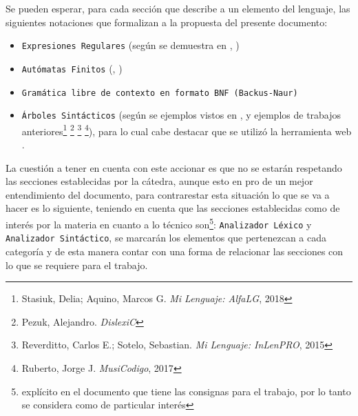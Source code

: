 Se pueden esperar, para cada sección que describe a un elemento del lenguaje,
las siguientes notaciones que formalizan a la propuesta del presente
documento:
\begin{itemize}
  \item \texttt{Expresiones Regulares} (según se demuestra en \cite{regexr},
    \cite{dib})
  \item \texttt{Autómatas Finitos} (\cite{aho2008}, \cite{catalan2010})
  \item \texttt{Gramática libre de contexto en formato BNF (Backus-Naur)}
  \item \texttt{Árboles Sintácticos} (según se ejemplos vistos en
    \cite{aho2008}, y ejemplos de trabajos anteriores\footnote{Stasiuk, Delia;
    Aquino, Marcos G. \textit{Mi Lenguaje: AlfaLG}, 2018} \footnote{Pezuk,
    Alejandro. \textit{DislexiC}} \footnote{Reverditto, Carlos E.; Sotelo, Sebastian.
    \textit{Mi Lenguaje: InLenPRO}, 2015} \footnote{Ruberto, Jorge J.
    \textit{MusiCodigo}, 2017}),
    para lo cual cabe destacar que se utilizó la herramienta
    web \cite[phpSyntaxTree]{syntree}.
\end{itemize}

La cuestión a tener en cuenta con este accionar es que no se estarán respetando las secciones
establecidas por la cátedra, aunque esto en pro de un mejor entendimiento del
documento, para contrarestar esta situación lo que se va a hacer es lo
siguiente, teniendo en cuenta que las secciones establecidas como de interés
por la materia en cuanto a lo técnico son\footnote{explícito en el
documento que tiene las consignas para el trabajo, por lo tanto se considera
como de particular interés}: \texttt{Analizador Léxico} y \texttt{Analizador
Sintáctico}, se marcarán los elementos que pertenezcan a cada categoría y de
esta manera contar con una forma de relacionar las secciones con lo que se
requiere para el trabajo.



















